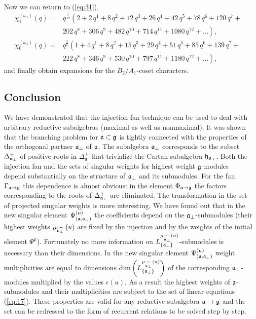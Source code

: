 Now we can return to (\ref{eq:31}),
\begin{equation*}
  \label{eq:35}
  \begin{array}{cc}
    \chi^{(\omega_1)}_{1}(q)= & q^{\frac{7}{12}}\left( 2+2\,q^{1}+8\,q^{2}+12\,q^{3}+26\,q^{4}+42\,q^{5}+78\,q^{6}+120\,q^{7}+\right. \\
    & \left. 202\,q^{8}+306\,q^{9}+482\,q^{10}+714\,q^{11}+1080\,q^{12}+\dots \right),\\
    \chi^{(\omega_1)}_{0}(q) = & q^{\frac{5}{6}}\left(1 + 4\,q^{1}+ 8\,q^{2}+ 15\,q^{3}+ 29\,q^{4}+ 51\,q^{5}+ 85\,q^{6}+ 139\,q^{7}+\right. \\
    &\left. 222\,q^{8}+ 346\,q^{9}+ 530\,q^{10}+ 797\,q^{11}+ 1180\,q^{12}+\dots\right),
  \end{array}
\end{equation*}
and finally obtain expansions for the $B_2/A_1$-coset characters.


\subsection{Conclusion}
\label{sec:conclusion}
We have demonstrated that the injection fan technique can be used to deal with arbitrary
reductive subalgebras (maximal as well as  nonmaximal).
It was shown that the branching problem for $\mathfrak{a} \subset \mathfrak{g}$  is tightly connected with
the properties of the orthogonal partner $ \mathfrak{a}_{\perp
} $ of $\mathfrak{a}$. The subalgebra $\mathfrak{a}_{\bot}$ corresponds to the subset
$\Delta^{+}_{\mathfrak{a}_{\bot}}$ of positive roots in $\Delta_{\mathfrak{g}}^{+}$ that trivialize
the Cartan subalgebra $\mathfrak{h}_{\mathfrak{a}_{\bot}}$.
Both the injection fan and the sets of singular weights for
highest weight $\mathfrak{g}$-modules depend substantially on the structure of $\mathfrak{a}_{\bot}$ and its submodules.
For the fan $\Gamma_{\mathfrak{a}\rightarrow \mathfrak{g}}$ this dependence is almost obvious:
in the element $\Phi_{\mathfrak{a}\rightarrow \mathfrak{g}}$ the factors corresponding to the roots
of $\Delta^{+}_{\mathfrak{a}_{\bot}}$ are eliminated.
The transformation in the set of projected singular weights is more interesting.
We have found out that in the new singular element
$\Psi ^{\left( \mu \right) }_{\left(  \mathfrak{a}, \mathfrak{a}_{\bot} \right)}$ the coefficients depend on
the $\mathfrak{a}_{\bot}$-submodules (their highest weights $\mu _{\widetilde{\mathfrak{a}_{\perp }}}\left( u\right)$
are fixed by the injection and by the weights of the initial
element $\Psi^{\mu}$).
Fortunately no more information on $L^{\mu _{\widetilde{\mathfrak{a}_{\perp }}}\left( u\right)}
_{\left\{ \mathfrak{a}_{\bot} \right\}}$-submodules is necessary than their dimensions.
In the new singular element $\Psi ^{\left( \mu \right) }_{\left(  \mathfrak{a}, \mathfrak{a}_{\bot} \right)}$
weight multiplicities are equal to dimensions
$\dim\left(L^{\mu _{\widetilde{\mathfrak{a}_{\perp }}}\left( u\right)}_{\left\{ \mathfrak{a}_{\bot} \right\}}\right)$
of the corresponding $\mathfrak{a}_{\bot}$-modules
multiplied by the values $\epsilon (u)$. As a result
the highest weights of $\mathfrak{a}$-submodules and their
multiplicities are subject to the set of linear equations (\ref{eq:17}).
These properties are valid for any reductive subalgebra $\mathfrak{a}\rightarrow \mathfrak{g}$ and
the set can be redressed to the form of recurrent relations to be solved step by step.

